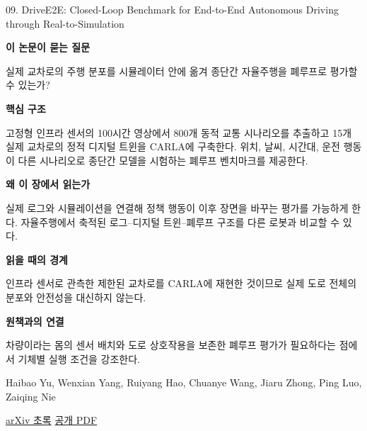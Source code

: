 \documentclass[11pt,openany]{book}
\begin{document}
\begin{termcard}{09. DriveE2E: Closed-Loop Benchmark for End-to-End Autonomous Driving through Real-to-Simulation}

\par

\medskip

{\sffamily\bfseries\color{deepblue} 이 논문이 묻는 질문}\par

실제 교차로의 주행 분포를 시뮬레이터 안에 옮겨 종단간 자율주행을 폐루프로 평가할 수 있는가?

\smallskip

{\sffamily\bfseries\color{deepblue} 핵심 구조}\par

고정형 인프라 센서의 100시간 영상에서 800개 동적 교통 시나리오를 추출하고 15개 실제 교차로의 정적 디지털 트윈을 CARLA에 구축한다. 위치, 날씨, 시간대, 운전 행동이 다른 시나리오로 종단간 모델을 시험하는 폐루프 벤치마크를 제공한다.

\smallskip

{\sffamily\bfseries\color{deepblue} 왜 이 장에서 읽는가}\par

실제 로그와 시뮬레이션을 연결해 정책 행동이 이후 장면을 바꾸는 평가를 가능하게 한다. 자율주행에서 축적된 로그–디지털 트윈–폐루프 구조를 다른 로봇과 비교할 수 있다.

\smallskip

{\sffamily\bfseries\color{coral} 읽을 때의 경계}\par

인프라 센서로 관측한 제한된 교차로를 CARLA에 재현한 것이므로 실제 도로 전체의 분포와 안전성을 대신하지 않는다.

\smallskip

{\sffamily\bfseries\color{teal} 원책과의 연결}\par

차량이라는 몸의 센서 배치와 도로 상호작용을 보존한 폐루프 평가가 필요하다는 점에서 기체별 실행 조건을 강조한다.

\medskip

{\footnotesize\color{muted} Haibao Yu, Wenxian Yang, Ruiyang Hao, Chuanye Wang, Jiaru Zhong, Ping Luo, Zaiqing Nie\par

\href{https://arxiv.org/abs/2509.23922}{arXiv 초록} \quad \href{https://arxiv.org/pdf/2509.23922}{공개 PDF}\par}

\end{termcard}
\end{document}
